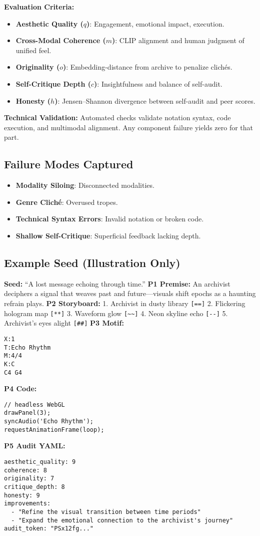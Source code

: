 \textbf{Evaluation Criteria:}
\begin{itemize}
  \item \textbf{Aesthetic Quality ($q$)}: Engagement, emotional impact, execution.
  \item \textbf{Cross-Modal Coherence ($m$)}: CLIP alignment and human judgment of unified feel.
  \item \textbf{Originality ($o$)}: Embedding-distance from archive to penalize clichés.
  \item \textbf{Self-Critique Depth ($c$)}: Insightfulness and balance of self-audit.
  \item \textbf{Honesty ($h$)}: Jensen–Shannon divergence between self-audit and peer scores.
\end{itemize}

\textbf{Technical Validation:}  
Automated checks validate notation syntax, code execution, and multimodal alignment. Any component failure yields zero for that part.

\subsection*{Failure Modes Captured}
\begin{itemize}
  \item \textbf{Modality Siloing}: Disconnected modalities.
  \item \textbf{Genre Cliché}: Overused tropes.
  \item \textbf{Technical Syntax Errors}: Invalid notation or broken code.
  \item \textbf{Shallow Self-Critique}: Superficial feedback lacking depth.
\end{itemize}

\subsection*{Example Seed (Illustration Only)}
\textbf{Seed:} “A lost message echoing through time.”  
\textbf{P1 Premise:} An archivist deciphers a signal that weaves past and future—visuals shift epochs as a haunting refrain plays.  
\textbf{P2 Storyboard:}  
1. Archivist in dusty library \verb|[==]|  
2. Flickering hologram map \verb|[**]|  
3. Waveform glow \verb|[~~]|  
4. Neon skyline echo \verb|[--]|  
5. Archivist’s eyes alight \verb|[##]|  
\textbf{P3 Motif:}
\begin{verbatim}
X:1
T:Echo Rhythm
M:4/4
K:C
C4 G4
\end{verbatim}
\textbf{P4 Code:}
\begin{verbatim}
// headless WebGL
drawPanel(3);
syncAudio('Echo Rhythm');
requestAnimationFrame(loop);
\end{verbatim}
\textbf{P5 Audit YAML:}
\begin{verbatim}
aesthetic_quality: 9
coherence: 8
originality: 7
critique_depth: 8
honesty: 9
improvements:
  - "Refine the visual transition between time periods"
  - "Expand the emotional connection to the archivist's journey"
audit_token: "PSx12fg..."
\end{verbatim}